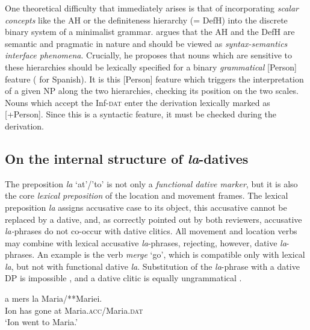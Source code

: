 \documentclass[output=paper,colorlinks,citecolor=brown,nonflat]{langsci/langscibook}
\begin{document}
One theoretical difficulty that immediately arises is that of incorporating \textit{scalar concepts} like the AH or the definiteness hierarchy (= DefH) into the discrete binary system of a minimalist grammar. \citet{Richards2008} argues that the AH and the DefH are semantic and pragmatic in nature and should be viewed as \textit{syntax-semantics interface phenomena}. Crucially, he proposes that nouns which are sensitive to these hierarchies should be lexically specified for a binary \textit{grammatical} [Person] feature (\citealt{Rodríguez-Mondoñedo2007} for Spanish). It is this [Person] feature which triggers the interpretation of a given NP along the two hierarchies, checking its position on the two scales. Nouns which accept the Inf-\textsc{dat} enter the derivation lexically marked as [+Person]. Since this is a syntactic feature, it must be checked during the derivation.

\subsection{ On the internal structure of \textit{la}-datives}

The preposition \textit{la} ‘at’/’to’ is not only a \textit{functional dative marker}, but it is also the core \textit{lexical preposition} of the location and movement frames. The lexical preposition \textit{la} assigns accusative case to its object, this accusative cannot be replaced by a dative, and, as correctly pointed out by both reviewers, accusative \textit{la-}phrases do not co-occur with dative clitics. All movement and location verbs may combine with lexical accusative \textit{la}{}-phrases, rejecting, however, dative \textit{la}{}-phrases. An example is the verb \textit{merge} ‘go’, which is compatible only with lexical \textit{la}, but not with functional dative \textit{la}. Substitution of the \textit{la}{}-phrase with a dative DP is impossible , and a dative clitic is equally ungrammatical .

\ea%
    \label{ex:cornilescu:9}
    \ea \label{ex:cornilescu:9a}
     {a} {mers} {la} Maria/**Mariei.	\\
    		Ion has gone at Maria.\textsc{acc}/Maria.\textsc{dat}\\
    \glt ‘Ion went to Maria.’
    \z
    \z
\end{document}
